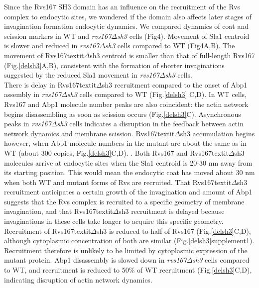 \documentclass[9pt,lineno]{elife}
\begin{document}
Since the Rvs167 SH3 domain has an influence on the recruitment of the Rvs complex to endocytic sites, we wondered if the domain also affects later stages of invagination formation endocytic dynamics. We compared dynamics of coat and scission markers in WT and \textit{rvs167$\Delta$sh3} cells (Fig4). Movement of Sla1 centroid is slower and reduced in \textit{rvs167$\Delta$sh3} cells compared to WT (Fig4A,B). The movement of Rvs167textit{$\Delta$sh3}  centroid is smaller than that of full-length Rvs167 (Fig.\ref{delsh3}A,B), consistent with the formation of shorter invaginations suggested by the reduced Sla1 movement in \textit{rvs167$\Delta$sh3} cells.
~\\
There is delay in Rvs167textit{$\Delta$sh3} recruitment compared to the onset of Abp1 assembly in \textit{rvs167$\Delta$sh3} cells compared to WT (Fig.\ref{delsh3} C,D). In WT cells, Rvs167 and Abp1 molecule number peaks are also coincident: the actin network begins disassembling as soon as scission occurs (Fig.\ref{delsh3}C). Asynchronous peaks in \textit{rvs167$\Delta$sh3} cells indicates a disruption in the feedback between actin network dynamics and membrane scission. Rvs167textit{$\Delta$sh3} accumulation begins however, when Abp1 molecule numbers in the mutant are about the same as in WT (about 300 copies, Fig.\ref{delsh3}C,D). . Both Rvs167 and Rvs167textit{$\Delta$sh3} molecules arrive at endocytic sites when the Sla1 centroid is 20-30 nm away from its starting position. This would mean the endocytic coat has moved about 30 nm when both WT and mutant forms of Rvs are recruited. That Rvs167textit{$\Delta$sh3} recruitment anticipates a certain growth of the invagination and amount of Abp1 suggests that the Rvs complex is recruited to a specific geometry of membrane invagination, and that Rvs167textit{$\Delta$sh3} recruitment is delayed because invaginations in these cells take longer to acquire this specific geometry. Recruitment of Rvs167textit{$\Delta$sh3}  is reduced to half of Rvs167 (Fig.\ref{delsh3}C,D), although cytoplasmic concentration of both are similar (Fig.\ref{delsh3}supplement1). Recruitment therefore is unlikely to be limited by cytoplasmic expression of the mutant protein. Abp1 disassembly is slowed down in \textit{rvs167$\Delta$sh3} cells compared to WT, and recruitment is reduced to 50\% of WT recruitment (Fig.\ref{delsh3}C,D), indicating disruption of actin network dynamics.

	
\end{document}
